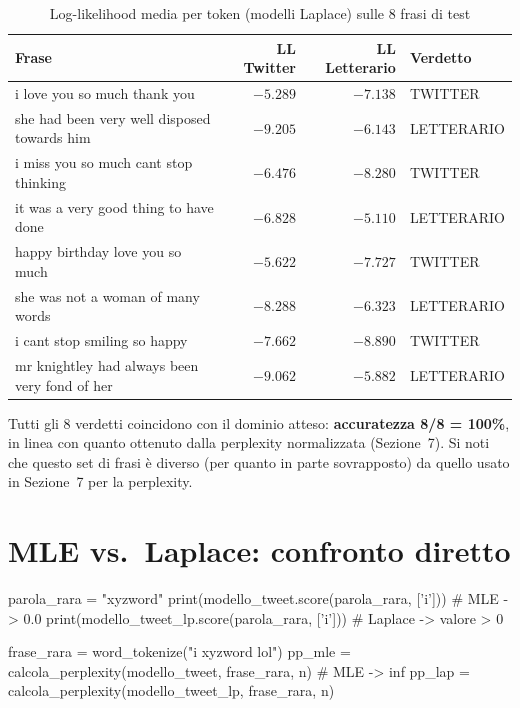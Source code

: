 ﻿\documentclass[12pt,a4paper]{article}
\begin{document}
\begin{table}[H]
  \centering
  \caption{Log-likelihood media per token (modelli Laplace) sulle 8 frasi di test}
  \small
  \begin{tabular}{>{\raggedright\arraybackslash}p{6.8cm}rrl}
    \toprule
    \textbf{Frase} & \textbf{LL Twitter} & \textbf{LL Letterario} & \textbf{Verdetto} \\
    \midrule
    i love you so much thank you                 & $-5.289$ & $-7.138$ & TWITTER \\
    she had been very well disposed towards him   & $-9.205$ & $-6.143$ & LETTERARIO \\
    i miss you so much cant stop thinking         & $-6.476$ & $-8.280$ & TWITTER \\
    it was a very good thing to have done         & $-6.828$ & $-5.110$ & LETTERARIO \\
    happy birthday love you so much               & $-5.622$ & $-7.727$ & TWITTER \\
    she was not a woman of many words             & $-8.288$ & $-6.323$ & LETTERARIO \\
    i cant stop smiling so happy                  & $-7.662$ & $-8.890$ & TWITTER \\
    mr knightley had always been very fond of her & $-9.062$ & $-5.882$ & LETTERARIO \\
    \bottomrule
  \end{tabular}
\end{table}

Tutti gli 8 verdetti coincidono con il dominio atteso: \textbf{accuratezza 8/8 = 100\%}, in linea con quanto ottenuto dalla perplexity normalizzata (Sezione~7). Si noti che questo set di frasi è diverso (per quanto in parte sovrapposto) da quello usato in Sezione~7 per la perplexity.

\section{MLE vs.\ Laplace: confronto diretto}

\begin{pylisting}[title={Confronto MLE e Laplace su parola mai vista}]
parola_rara = "xyzword"
print(modello_tweet.score(parola_rara, ['i']))     # MLE    -> 0.0
print(modello_tweet_lp.score(parola_rara, ['i']))  # Laplace -> valore > 0

frase_rara = word_tokenize("i xyzword lol")
pp_mle = calcola_perplexity(modello_tweet,    frase_rara, n)  # MLE -> inf
pp_lap = calcola_perplexity(modello_tweet_lp, frase_rara, n)
\end{pylisting}
\end{document}
